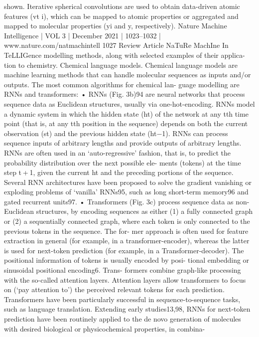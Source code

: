 shown. Iterative spherical convolutions are used to obtain data-driven atomic features (vt
i), which can be mapped to atomic properties or aggregated and
mapped to molecular properties (yi and y, respectively).
Nature Machine Intelligence | VOL 3 | December 2021 | 1023–1032 | www.nature.com/natmachintell
1027
Review Article
NaTuRe MachIne In TeLLIGence
modelling methods, along with selected examples of their applica-
tion to chemistry.
Chemical language models. Chemical language models are machine
learning methods that can handle molecular sequences as inputs
and/or outputs. The most common algorithms for chemical lan-
guage modelling are RNNs and transformers:
•
RNNs (Fig. 3b)94 are neural networks that process sequence data
as Euclidean structures, usually via one-hot-encoding. RNNs
model a dynamic system in which the hidden state (ht) of the
network at any tth time point (that is, at any tth position in the
sequence) depends on both the current observation (st) and the
previous hidden state (ht−1). RNNs can process sequence inputs
of arbitrary lengths and provide outputs of arbitrary lengths.
RNNs are often used in an ‘auto-regressive’ fashion, that is, to
predict the probability distribution over the next possible ele-
ments (tokens) at the time step t + 1, given the current ht and the
preceding portions of the sequence. Several RNN architectures
have been proposed to solve the gradient vanishing or exploding
problems of ‘vanilla’ RNNs95, such as long short-term memory96
and gated recurrent units97.
•
Transformers (Fig. 3c) process sequence data as non-Euclidean
structures, by encoding sequences as either (1) a fully connected
graph or (2) a sequentially connected graph, where each token is
only connected to the previous tokens in the sequence. The for-
mer approach is often used for feature extraction in general (for
example, in a transformer-encoder), whereas the latter is used for
next-token prediction (for example, in a Transformer-decoder).
The positional information of tokens is usually encoded by posi-
tional embedding or sinusoidal positional encoding6. Trans-
formers combine graph-like processing with the so-called
attention layers. Attention layers allow transformers to focus
on (‘pay attention to’) the perceived relevant tokens for each
prediction. Transformers have been particularly successful in
sequence-to-sequence tasks, such as language translation.
Extending early studies13,98, RNNs for next-token prediction
have been routinely applied to the de novo generation of molecules
with desired biological or physicochemical properties, in combina-
